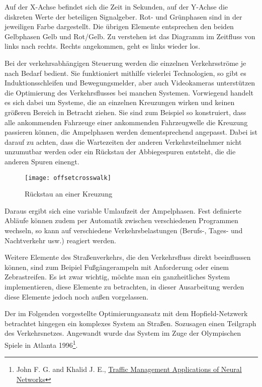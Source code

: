 Auf der X-Achse befindet sich die Zeit in Sekunden, auf der Y-Achse die diskreten Werte der beteiligen Signalgeber. Rot- und Grünphasen sind in der jeweiligen Farbe dargestellt. Die übrigen Elemente entsprechen den beiden Gelbphasen Gelb und Rot/Gelb. Zu verstehen ist das Diagramm im Zeitfluss von links nach rechts. Rechts angekommen, geht es links wieder los.

Bei der verkehrsabhängigen Steuerung werden die einzelnen Verkehrsströme je nach Bedarf bedient. Sie funktioniert mithilfe vielerlei Technologien, so gibt es Induktionsschleifen und Bewegungsmelder, aber auch Videokameras unterstützen die Optimierung des Verkehrsflusses bei manchen Systemen. Vorwiegend handelt es sich dabei um Systeme, die an einzelnen Kreuzungen wirken und keinen größeren Bereich in Betracht ziehen. Sie sind zum Beispiel so konstruiert, dass alle ankommenden Fahrzeuge einer ankommenden Fahrzeugwelle die Kreuzung passieren können, die Ampelphasen werden dementsprechend angepasst. Dabei ist darauf zu achten, dass die Wartezeiten der anderen Verkehrsteilnehmer nicht unzumutbar werden oder ein Rückstau der Abbiegespuren entsteht, die die anderen Spuren einengt.

\begin{figure}[H]
    \centering
    \texttt{[image: offsetcrosswalk]}
    \caption{Rückstau an einer Kreuzung}
    \label{intro:rueckstau}
\end{figure}

Daraus ergibt sich eine variable Umlaufzeit der Ampelphasen. Fest definierte Abläufe können zudem per Automatik zwischen verschiedenen Programmen wechseln, so kann auf verschiedene Verkehrsbelastungen (Berufs-, Tages- und Nachtverkehr usw.) reagiert werden.

Weitere Elemente des Straßenverkehrs, die den Verkehrsfluss direkt beeinflussen können, sind zum Beipiel Fußgängerampeln mit Anforderung oder einem Zebrastreifen. Es ist zwar wichtig, möchte man ein ganzheitliches System implementieren, diese Elemente zu betrachten, in dieser Ausarbeitung werden diese Elemente jedoch noch außen vorgelassen.

Der im Folgenden vorgestellte Optimierungsansatz mit dem Hopfield-Netzwerk betrachtet hingegen ein komplexes System an Straßen. Sozusagen einen Teilgraph des Verkehrsnetzes. Angewandt wurde das System im Zuge der Olympischen Spiele in Atlanta 1996\footnote{John F. G. and Khalid J. E., \href{https://www.aaai.org/Papers/Workshops/1993/WS-93-04/WS93-04-012.pdf}{Traffic Management Applications of Neural Networks}}.


